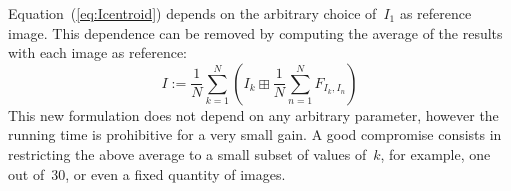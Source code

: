 \documentclass{ipol}
\begin{document}

Equation~(\ref{eq:Icentroid}) depends on the arbitrary choice of~$I_1$ as
reference image.  This dependence can be removed by computing the average of
the results with each image as reference:
\begin{equation}
	I:=\frac{1}{N}\sum_{k=1}^N\left(I_k\boxplus\frac{1}{N}\sum_{n=1}^NF_{I_k,I_n}\right)
	\label{eq:Irecentroid}
\end{equation}
This new formulation does not depend on any arbitrary parameter, however the
running time is prohibitive for a very small gain.  A good compromise consists
in restricting the above average to a small subset of values of~$k$, for
example, one out of~$30$, or even a fixed quantity of images.
%

\end{document}
